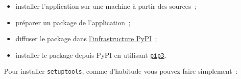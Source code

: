 \begin{itemize}
\tightlist
\item
  installer l'application sur une machine à partir des sources~;
\item
  préparer un package de l'application~;
\item
  diffuser le package dans
  \href{https://pypi.python.org/pypi}{l'infrastructure PyPI}~;
\item
  installer le package depuis PyPI en utilisant
  \href{http://pip.readthedocs.org/en/latest/installing.html}{\texttt{pip3}}.
\end{itemize}

    Pour installer \texttt{setuptools}, comme d'habitude vous pouvez faire
simplement~:

\begin{Shaded}
\begin{Highlighting}[frame=lines,framerule=0.6mm,rulecolor=\color{asisframecolor}]
\end{Highlighting}
\end{Shaded}


    
    
    

